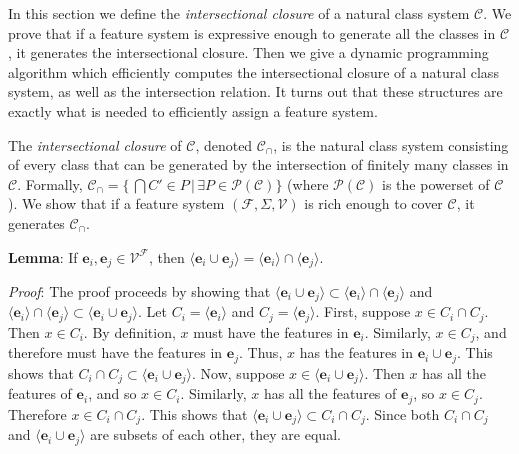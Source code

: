 \documentclass[11pt, oneside]{article}   	%
\begin{document}
In this section we define the \textit{intersectional closure} of a natural class system $\mathcal C$. We prove that if a feature system is expressive enough to generate all the classes in $\mathcal C$, it generates the intersectional closure. Then we give a dynamic programming algorithm which efficiently computes the intersectional closure of a natural class system, as well as the intersection relation. It turns out that these structures are exactly what is needed to efficiently assign a feature system.

\vspace{\baselineskip} The \textit{intersectional closure} of $\mathcal C$, denoted $\mathcal C_\cap$, is the natural class system consisting of every class that can be generated by the intersection of finitely many classes in $\mathcal C$. Formally, $\mathcal C_\cap = \{\, \bigcap {C' \in P}  \, | \, \exists P \in \mathcal P(\mathcal C) \}$ (where $\mathcal P(\mathcal C)$ is the powerset of $\mathcal C$). We show that if a feature system $(\mathcal F, \Sigma, \mathcal V)$ is rich enough to cover $\mathcal C$, it generates $\mathcal C_\cap$.

\vspace{\baselineskip} \noindent \textbf{Lemma}: If $\mathbf{e}_i, \mathbf{e}_j \in \mathcal V^\mathcal F$, then $\langle \mathbf{e}_i \cup \mathbf{e}_j \rangle =  \langle \mathbf{e}_i \rangle \cap \langle \mathbf{e}_j \rangle$.

\textit{Proof}: The proof proceeds by showing that $\langle \mathbf{e}_i \cup \mathbf{e}_j \rangle \subset  \langle \mathbf{e}_i \rangle \cap \langle \mathbf{e}_j \rangle$ and $ \langle \mathbf{e}_i \rangle \cap \langle \mathbf{e}_j \rangle \subset \langle \mathbf{e}_i \cup \mathbf{e}_j \rangle$.
Let $C_i = \langle \mathbf{e}_i \rangle$ and $C_j = \langle \mathbf{e}_j \rangle$.
First, suppose $x \in C_i \cap C_j$. Then $x \in C_i$. By definition, $x$ must have the features in $\mathbf{e}_i$.
Similarly, $x \in C_j$, and therefore must have the features in $\mathbf{e}_j$.
Thus, $x$ has the features in $\mathbf{e}_i \cup \mathbf{e}_j$. This shows that $C_i \cap C_j \subset \langle \mathbf{e}_i \cup \mathbf{e}_j \rangle$.
Now, suppose $x \in \langle \mathbf{e}_i \cup \mathbf{e}_j \rangle$. Then $x$ has all the features of $\mathbf{e}_i$, and so $x \in C_i$.
Similarly, $x$ has all the features of $\mathbf{e}_j$, so $x \in C_j$. Therefore $x \in C_i \cap C_j$. This shows that $\langle \mathbf{e}_i \cup \mathbf{e}_j \rangle \subset C_i \cap C_j$.
Since both $C_i \cap C_j$ and $\langle \mathbf{e}_i \cup \mathbf{e}_j \rangle$ are subsets of each other, they are equal.
\end{document}
